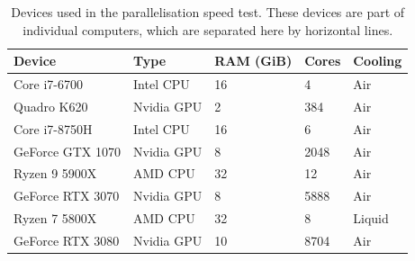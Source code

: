 \documentclass{jors}
\begin{document}
			\begin{table}[h!]
				\caption{Devices used in the parallelisation speed test. These devices are part of individual computers, which are separated here by horizontal lines.}
				\label{tab:devices}
				\begin{tabular}{l|l|l|l|l}
					\textbf{Device}	&\textbf{Type}	&\textbf{RAM (GiB)}	&\textbf{Cores}	&\textbf{Cooling}\\
					\hline
					Core i7-6700	&Intel CPU		&16					&4				&Air\\
					Quadro K620		&Nvidia GPU		&2					&384			&Air\\
					\hline
					Core i7-8750H	&Intel CPU		&16					&6				&Air\\
					GeForce GTX 1070&Nvidia GPU		&8					&2048			&Air\\
					\hline
					Ryzen 9 5900X	&AMD CPU		&32					&12				&Air\\
					GeForce RTX 3070&Nvidia GPU		&8					&5888			&Air\\
					\hline
					Ryzen 7 5800X	&AMD CPU		&32					&8				&Liquid\\
					GeForce RTX 3080&Nvidia GPU		&10					&8704			&Air\\
				\end{tabular}
			\end{table}
\end{document}
